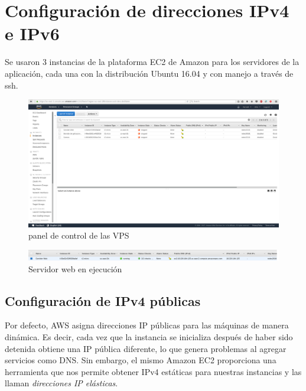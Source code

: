 \documentclass[9pt]{article}
\begin{document}
\newpage

\section{Configuración de direcciones IPv4 e IPv6} 
Se usaron 3 instancias de la plataforma \textsf{EC2} de Amazon para los servidores de la aplicación, cada una con la distribución \textsf{Ubuntu 16.04} y con manejo a través de \textsf{ssh}. 
\begin{figure}[H]
  \centering
  \includegraphics[width=\textwidth]{instances_dashboard}
  \caption{panel de control de las VPS}
\end{figure}
\begin{figure}[H]
  \centering
  \includegraphics[width=\textwidth]{web_server}
  \caption{Servidor web en ejecución}
\end{figure}

\subsection{Configuración de IPv4 públicas}
Por defecto, \textsf{AWS} asigna direcciones IP públicas para las máquinas de manera dinámica. Es decir, cada vez que la instancia se inicializa después de haber sido detenida obtiene una IP pública diferente, lo que genera problemas al agregar servicios como DNS. Sin embargo, el mismo \textsf{Amazon EC2} proporciona una herramienta que nos permite obtener IPv4 estáticas para nuestras instancias y las llaman \textit{direcciones IP elásticas}.\\
\end{document}

